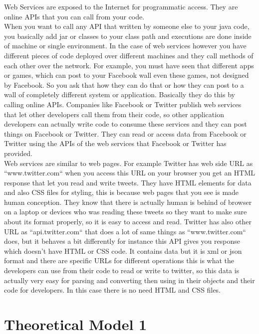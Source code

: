 Web Services are exposed to the Internet for programmatic access. They are online APIs that you can call from your code.\\
When you want to call any API that written by someone else to your java code, you basically add jar or classes to
your class path and executions are done inside of machine or single environment. In the case of web services however
you have different pieces of code deployed over different machines and they call methods of each other over the network.
For example, you must have seen that different apps or games, which can post to your Facebook wall even these games,
not designed by Facebook. So you ask that how they can do that or how they can post to a wall of completely different
system or application. Basically they do this by calling online APIs. Companies like Facebook or Twitter publish web
services that let other developers call them from their code, so other application developers can actually write
code to consume these services and they can post things on Facebook or Twitter. They can read or access data from
Facebook or Twitter using the APIs of the web services that Facebook or Twitter has provided.\\
Web services are similar to web pages. For example Twitter has web side URL as “www.twitter.com“ when you access
this URL on your browser you get an HTML response that let you read and write tweets. They have HTML elements for
data and also CSS files for styling, this is because web pages that you see is made human conception.
They know that there is actually human is behind of browser on a laptop or devices who was reading these tweets
so they want to make sure about its format properly, so it is easy to access and read.
Twitter has also other URL as “api.twitter.com“ that does a lot of same things as “www.twitter.com“ does,
but it behaves a bit differently for instance this API gives you response which doesn’t have HTML or CSS code.
It contains data but it is xml or json format and there are specific URLs for different operations this is what
the developers can use from their code to read or write to twitter, so this data is actually very easy for
parsing and converting then using in their objects and their code for developers. In this case there is no need HTML
and CSS files.

\section{Theoretical Model 1}
\label{section:theory1}

